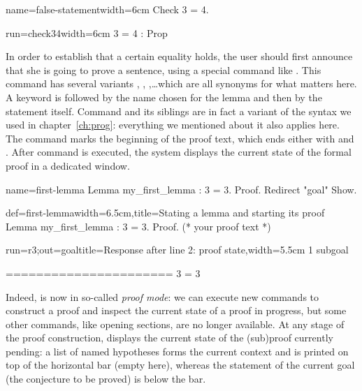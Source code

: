 \begin{coq}{name=false-statement}{width=6cm}
Check 3 = 4.
\end{coq}
\begin{coqout}{run=check34}{width=6cm}
3 = 4 : Prop
\end{coqout}

In order to establish that a certain equality holds, the user should
first announce that she is going to prove a sentence, using a special
command like . This command has several variants ,
, ,\dots which are all synonyms for what
matters here.
A  keyword is followed by the name chosen for the lemma and
then by the statement itself. Command  and its siblings are in fact
a variant of the  syntax we used in
chapter~\ref{ch:prog}: everything we mentioned about it also applies
here. The  command marks the beginning of the proof text,
which ends either with  and . After command
 is executed, the system displays the current state of the
formal proof in a dedicated window.

\begin{coqdef}{name=first-lemma}
Lemma my_first_lemma : 3 = 3.
Proof. Redirect "goal" Show.
\end{coqdef}
\begin{coq}{def=first-lemma}{width=6.5cm,title=Stating a lemma and starting its proof}
Lemma my_first_lemma : 3 = 3.
Proof.
(* your proof text *)
$~$
\end{coq}
\begin{coqout}{run=r3;out=goal}{title=Response after line 2: proof state,width=5.5cm}
1 subgoal

  ======================
   3 = 3
\end{coqout}

Indeed, \Coq{} is now in so-called \emph{proof mode}: we can execute
new commands to construct a proof and inspect the current state of a
proof in progress, but some other commands, like opening sections, are
no longer available. At any stage of the proof construction, \Coq{}
displays the current state of the (sub)proof currently pending:  a
list of named hypotheses forms the current context and is printed
on top of the horizontal bar (empty here), whereas
the statement of the current goal (the conjecture to be proved) is
below the bar.

